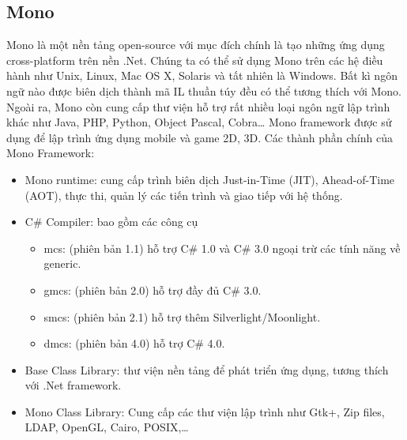\subsection{Mono}
Mono là một nền tảng open-source với mục đích chính là tạo những ứng dụng cross-platform trên nền .Net. Chúng ta có thể sử dụng Mono trên các hệ điều hành như Unix, Linux, Mac OS X, Solaris và tất nhiên là Windows. Bất kì ngôn ngữ nào được biên dịch thành mã IL thuần túy đều có thể tương thích với Mono. Ngoài ra, Mono còn cung cấp thư viện hỗ trợ rất nhiều loại ngôn ngữ lập trình khác như Java, PHP, Python, Object Pascal, Cobra… Mono framework được sử dụng để lập trình ứng dụng mobile và game 2D, 3D. Các thành phần chính của Mono Framework:
\begin{itemize}
\item Mono runtime: cung cấp trình biên dịch Just-in-Time (JIT), Ahead-of-Time (AOT), thực thi, quản lý các tiến trình và giao tiếp với hệ thống.
\item C\# Compiler: bao gồm các công cụ
\begin{itemize}
\item mcs: (phiên bản 1.1) hỗ trợ C\# 1.0 và C\# 3.0 ngoại trừ các tính năng về generic.
\item gmcs: (phiên bản 2.0) hỗ trợ đầy đủ C\# 3.0.
\item smcs: (phiên bản 2.1) hỗ trợ thêm Silverlight/Moonlight.
\item dmcs: (phiên bản 4.0) hỗ trợ C\# 4.0.
\end{itemize}
\item Base Class Library: thư viện nền tảng để phát triển ứng dụng, tương thích với .Net framework.
\item Mono Class Library: Cung cấp các thư viện lập trình như Gtk+, Zip files, LDAP, OpenGL, Cairo, POSIX,… \cite{4}
\end{itemize}
